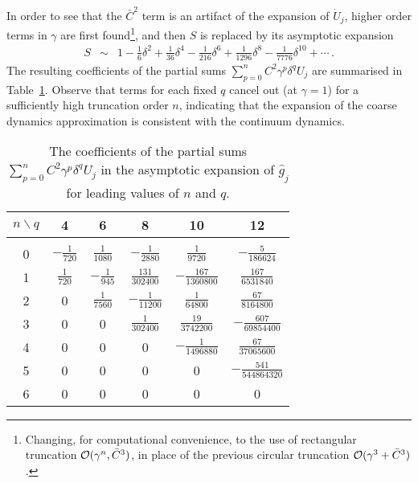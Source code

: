 \documentclass[12pt,a5paper]{article}
\begin{document}
In order to see that the $\bar{C}^2$ term is an artifact of the expansion of $\dot{U}_j$, 
higher order terms in $\gamma$ are first found\footnote{Changing, for computational convenience, to the use of rectangular truncation
${\cal O}(\gamma^n,\bar{C}^3)$, 
in place of the previous circular truncation ${\cal O}(\gamma^3+\bar{C}^3)$.}, and then $S$ is replaced by its asymptotic expansion
\begin{eqnarray}
S & \sim & 1-\frac{1}{6}\delta^2+\frac{1}{36}\delta^4-\frac{1}{216}\delta^6+\frac{1}{1296}\delta^8-\frac{1}{7776}\delta^{10}+\cdots\,.
\end{eqnarray}
The resulting coefficients of the partial sums $\sum_{p=0}^{n}C^2\gamma^p \delta^qU_j$ are summarised in Table~\ref{tab:terms}.
Observe that terms for each fixed $q$ cancel out (at $\gamma=1$) for a sufficiently high truncation order $n$,
indicating that the expansion of the coarse dynamics approximation is consistent with the continuum dynamics.
\begin{table}[hbtp]
\centering
\begin{tabular}{|c|c|c|c|c|c|}
\hline
$n\backslash q$ & 4 & 6 & 8 & 10 & 12\\
\hline
&&&&&\\[-2ex]
0 & $-\frac{1}{720}$ & $\frac{1}{1080}$ & $-\frac{1}{2880}$        & $\frac{1}{9720}$            & $-\frac{5}{186624}$\\[1ex]
1 & $\frac{1}{720}$  & $-\frac{1}{945}$  & $\frac{131}{302400}$ & $-\frac{167}{1360800}$ & $\frac{167}{6531840}$\\[1ex]
2 & 0                          & $\frac{1}{7560}$  & $-\frac{1}{11200}$     & $\frac{1}{64800}$           & $\frac{67}{8164800}$\\[1ex]
3 & 0                          & 0                            & $\frac{1}{302400}$     & $\frac{19}{3742200}$     & $-\frac{607}{69854400}$\\[1ex]
4 & 0                          & 0                            & 0                                   & $-\frac{1}{1496880}$      & $\frac{67}{37065600}$\\[1ex]
5 & 0                          & 0                            & 0                                   & 0                                        & $-\frac{541}{544864320}$\\[1ex]
6 & 0                          & 0                            & 0                                   & 0                                        & 0\\[1ex]
\hline
\end{tabular}
\caption{The coefficients of the partial sums $\sum_{p=0}^{n}C^2\gamma^p\delta^q U_j$ in the 
asymptotic expansion of $\hat{g}_j$ for leading values of $n$ and $q$.}
\label{tab:terms}
\end{table}
\end{document}
